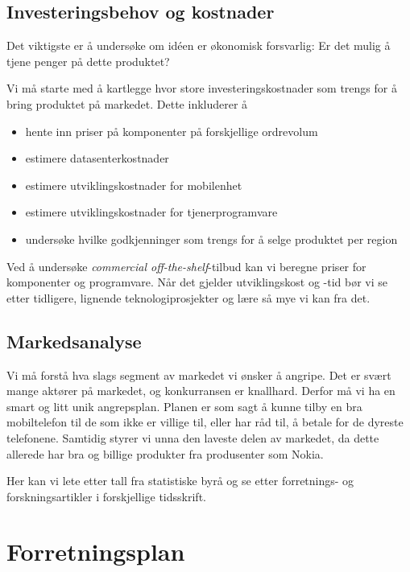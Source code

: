 \subsection{Investeringsbehov og kostnader}

Det viktigste er å undersøke om idéen er økonomisk forsvarlig: Er det mulig å
tjene penger på dette produktet?

Vi må starte med å kartlegge hvor store investeringskostnader som trengs for å
bring produktet på markedet.  Dette inkluderer å

\begin{itemize}
  \item hente inn priser på komponenter på forskjellige ordrevolum
  \item estimere datasenterkostnader
  \item estimere utviklingskostnader for mobilenhet
  \item estimere utviklingskostnader for tjenerprogramvare
  \item undersøke hvilke godkjenninger som trengs for å selge produktet per
    region
\end{itemize}

Ved å undersøke \textit{commercial off-the-shelf}-tilbud kan vi beregne priser
for komponenter og programvare.  Når det gjelder utviklingskost og -tid bør vi
se etter tidligere, lignende teknologiprosjekter og lære så mye vi kan fra det.

\subsection{Markedsanalyse}

Vi må forstå hva slags segment av markedet vi ønsker å angripe. Det er svært
mange aktører på markedet, og konkurransen er knallhard. Derfor må vi ha en
smart og litt unik angrepsplan.  Planen er som sagt å kunne tilby en bra
mobiltelefon til de som ikke er villige til, eller har råd til, å betale for de
dyreste telefonene.  Samtidig styrer vi unna den laveste delen av markedet, da
dette allerede har bra og billige produkter fra produsenter som Nokia.

Her kan vi lete etter tall fra statistiske byrå og se etter forretnings- og
forskningsartikler i forskjellige tidsskrift.


\section{Forretningsplan}

